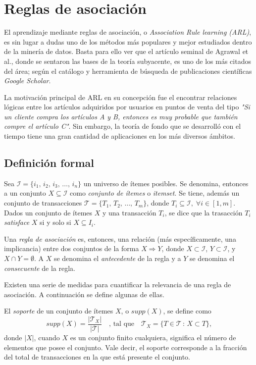 \section{Reglas de asociación}

El aprendizaje mediante reglas de asociación, o \textit{Association Rule learning (ARL)}, es sin lugar a dudas uno de los métodos más populares y mejor estudiados dentro de la minería de datos. Basta para ello ver que el artículo seminal de Agrawal et al.\cite{agrawal1993mining}, donde se sentaron las bases de la teoría subyacente, es uno de los más citados del área; según el catálogo y herramienta de búsqueda de publicaciones científicas \textit{Google Scholar}.

La motivación principal de ARL en su concepción fue el encontrar relaciones lógicas entre los artículos adquiridos por usuarios en puntos de venta del tipo \textit{"Si un cliente compra los artículos A y B, entonces es muy probable que también compre el artículo C"}. Sin embargo, la teoría de fondo que se desarrolló con el tiempo tiene una gran cantidad de aplicaciones en los más diversos ámbitos.

\subsection{Definición formal}

Sea $\mathcal{I} = \{i_1,\,i_2,\,i_3,\,\ldots ,\,i_n\}$ un universo de ítemes posibles. Se denomina, entonces a un conjunto $X \subseteq \mathcal{I}$ como \textit{conjunto de ítemes} o \textit{itemset}. Se tiene, además un conjunto de transacciones $\mathcal{T} = \{T_1,\,T_2,\,\ldots,\,T_m\}$, donde $T_i \subseteq \mathcal{I}, \; \forall i \in {[1,m]}$. Dados un conjunto de ítemes $X$ y una transacción $T_i$, se dice que la trasacción $T_i$ \textit{satisface} $X$ si y solo si $X \subseteq I_i$.

Una \textit{regla de asociación} es, entonces, una relación (más específicamente, una implicancia) entre dos conjuntos de la forma $X \Rightarrow Y$, donde $X \subset \mathcal{I}$, $Y \subset \mathcal{I}$, y $X \cap Y = \emptyset$. A $X$ se denomina el \textit{antecedente} de la regla y a $Y$ se denomina el \textit{consecuente} de la regla.

Existen una serie de medidas para cuantificar la relevancia de una regla de asociación. A continuación se define algunas de ellas.

El \textit{soporte} de un conjunto de ítemes $X$, o $\mathit{supp}(X)$, se define como $$\mathit{supp}(X) = \frac{|\mathcal{T}_X|}{|\mathcal{T}|} \quad \text{, tal que} \quad \mathcal{T}_X = \{T \in \mathcal{T} \, : \, X \subset T \}\text{,}$$ donde $|X|$, cuando $X$ es un conjunto finito cualquiera, significa el número de elementos que posee el conjunto. Vale decir, el soporte corresponde a la fracción del total de transacciones en la que está presente el conjunto.


